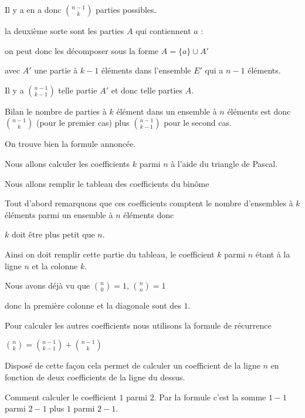 Il y a en a donc $\binom{n-1}{k}$ parties possibles.
  
\change

la deuxième sorte sont les parties $A$ qui contiennent $a$ : 

\change

on peut donc les décomposer sous la forme $A = \{a\} \cup A'$ 

avec $A'$ une partie à $k-1$ éléments dans l'ensemble $E'$ qui a $n-1$ éléments. 

Il y a $\binom{n-1}{k-1}$ telle partie $A'$ et donc telle parties $A$.

\change

Bilan le nombre de parties à $k$ élément dans un ensemble à $n$ éléments
est donc $\binom{n-1}{k}$ (pour le premier cas) plus $\binom{n-1}{k-1}$ pour
le second cas.

On trouve bien la formule annoncée.



\diapo

Nous allons calculer les coefficients $k$ parmi $n$ à l'aide du triangle de Pascal.

Nous allons remplir le tableau des coefficients du binôme

\change

Tout d'abord remarquons que ces coefficients comptent le nombre
 d'ensembles à $k$ éléments parmi un ensemble à $n$ éléments donc 

$k$ doit être plus petit que $n$.

Ainsi on doit remplir cette partie du tableau, le coefficient $k$ parmi $n$
étant à la ligne $n$ et la colonne $k$.

\change

Nous avons déjà vu que 
$\binom{n}{0}=1$, $\binom{n}{n}=1$

donc la première colonne et la diagonale sont des $1$.


\change

Pour calculer les autres coefficients nous utilisons la formule de récurrence 

$\binom n k = \binom{n-1}{k-1} + \binom{n-1}{k}$

Disposé de cette façon cela permet de calculer un coefficient de la ligne $n$
en fonction de deux coefficients de la ligne du dessus.

\change

Comment calculer le coefficient $1$ parmi $2$.
Par la formule c'est la somme $1-1$ parmi $2-1$ plus $1$ parmi $2-1$.  

